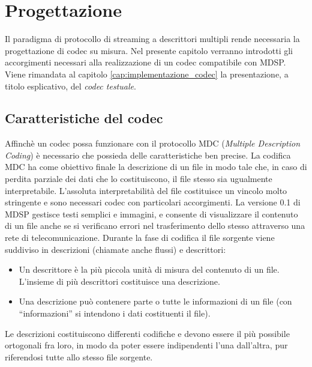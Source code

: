 \chapter{Progettazione}
\label{cap:descrizione_codec}
Il paradigma di protocollo di streaming a descrittori multipli rende
necessaria la progettazione di codec su misura. Nel presente capitolo
verranno introdotti gli accorgimenti necessari alla realizzazione di un codec
compatibile con MDSP. Viene rimandata al capitolo
\ref{cap:implementazione_codec} la presentazione, a titolo esplicativo, del
\emph{codec testuale}.

\section{Caratteristiche del codec}
Affinch\`e un codec possa funzionare con il protocollo MDC (\emph{Multiple Description Coding}) è necessario che possieda delle caratteristiche ben precise. La codifica MDC ha come obiettivo finale la descrizione di un file in modo tale che, in caso di perdita parziale dei dati che lo costituiscono, il file stesso sia ugualmente interpretabile. L'assoluta interpretabilit\`a del file costituisce un vincolo molto stringente e sono necessari codec con particolari accorgimenti. La versione 0.1 di MDSP gestisce testi semplici e immagini, e consente di visualizzare il contenuto di un file anche se si verificano errori nel trasferimento dello stesso attraverso una rete di telecomunicazione. Durante la fase di codifica il file sorgente viene suddiviso in descrizioni (chiamate anche flussi) e descrittori:
\begin{itemize}
 \item Un descrittore \`e la pi\`u piccola unit\`a di misura del contenuto di un file. L'insieme di pi\`u descrittori costituisce una descrizione.
 \item Una descrizione pu\`o contenere parte o tutte le informazioni di un file (con ``informazioni'' si intendono i dati costituenti il file).
\end{itemize}
Le descrizioni costituiscono differenti codifiche e devono essere il più possibile ortogonali fra loro, in modo da poter essere indipendenti l'una dall'altra, pur riferendosi tutte allo stesso file sorgente.

